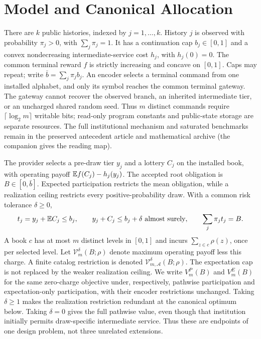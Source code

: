 \section{Model and Canonical Allocation}\label{sec:joint}
There are $k$ public histories, indexed by $j=1,\ldots,k$. History $j$ is observed with probability $\pi_j>0$, with $\sum_j\pi_j=1$. It has a continuation cap $b_j\in[0,1]$ and a convex nondecreasing intermediate-service cost $h_j$, with $h_j(0)=0$. The common terminal reward $f$ is strictly increasing and concave on $[0,1]$. Caps may repeat; write $\bar b=\sum_j\pi_jb_j$. An encoder selects a terminal command from one installed alphabet, and only its symbol reaches the common terminal gateway. The gateway cannot recover the observed branch, an inherited intermediate tier, or an uncharged shared random seed. Thus $m$ distinct commands require $\lceil\log_2m\rceil$ writable bits; read-only program constants and public-state storage are separate resources. The full institutional mechanism and saturated benchmarks remain in the preserved antecedent article and mathematical archive (the companion gives the reading map).

The provider selects a pre-draw tier $y_j$ and a lottery $C_j$ on the installed book, with operating payoff $\mathbb E f(C_j)-h_j(y_j)$. The accepted root obligation is $B\in[0,\bar b]$. Expected participation restricts the mean obligation, while a realization ceiling restricts every positive-probability draw. With a common risk tolerance $\delta\geq0$,
\begin{equation}\label{eq:unified-feasible}
 t_j=y_j+\mathbb E C_j\leq b_j,\qquad
 y_j+C_j\leq b_j+\delta\ \text{almost surely},\qquad
 \sum_j\pi_jt_j=B.
\end{equation}
A book $c$ has at most $m$ distinct levels in $[0,1]$ and incurs $\sum_{z\in c}\rho(z)$, once per selected level. Let $\mathcal V_m^\delta(B;\rho)$ denote maximum operating payoff less this charge. A finite catalog restriction is denoted $\mathcal V_{m,\mathcal A}^\delta(B;\rho)$. The expectation cap is not replaced by the weaker realization ceiling. We write $V_m^P(B)$ and $V_m^E(B)$ for the same zero-charge objective under, respectively, pathwise participation and expectation-only participation, with their encoder restrictions unchanged. Taking $\delta\geq1$ makes the realization restriction redundant at the canonical optimum below. Taking $\delta=0$ gives the full pathwise value, even though that institution initially permits draw-specific intermediate service. Thus these are endpoints of one design problem, not three unrelated extensions.

